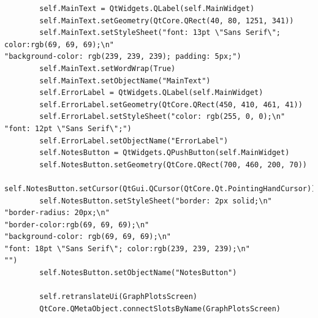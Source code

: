 \documentclass{article}
\begin{document}
\begin{lstlisting}
        self.MainText = QtWidgets.QLabel(self.MainWidget)
        self.MainText.setGeometry(QtCore.QRect(40, 80, 1251, 341))
        self.MainText.setStyleSheet("font: 13pt \"Sans Serif\"; color:rgb(69, 69, 69);\n"
"background-color: rgb(239, 239, 239); padding: 5px;")
        self.MainText.setWordWrap(True)
        self.MainText.setObjectName("MainText")
        self.ErrorLabel = QtWidgets.QLabel(self.MainWidget)
        self.ErrorLabel.setGeometry(QtCore.QRect(450, 410, 461, 41))
        self.ErrorLabel.setStyleSheet("color: rgb(255, 0, 0);\n"
"font: 12pt \"Sans Serif\";")
        self.ErrorLabel.setObjectName("ErrorLabel")
        self.NotesButton = QtWidgets.QPushButton(self.MainWidget)
        self.NotesButton.setGeometry(QtCore.QRect(700, 460, 200, 70))
        self.NotesButton.setCursor(QtGui.QCursor(QtCore.Qt.PointingHandCursor))
        self.NotesButton.setStyleSheet("border: 2px solid;\n"
"border-radius: 20px;\n"
"border-color:rgb(69, 69, 69);\n"
"background-color: rgb(69, 69, 69);\n"
"font: 18pt \"Sans Serif\"; color:rgb(239, 239, 239);\n"
"")
        self.NotesButton.setObjectName("NotesButton")

        self.retranslateUi(GraphPlotsScreen)
        QtCore.QMetaObject.connectSlotsByName(GraphPlotsScreen)


\end{lstlisting}
\end{document}
